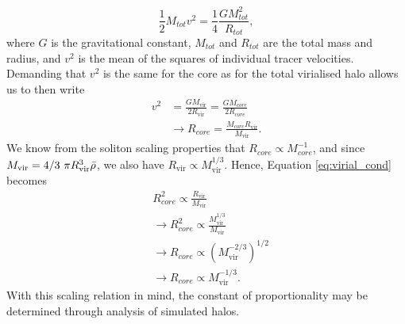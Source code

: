 \documentclass[a4paper,11pt]{article}
\begin{document}
\begin{appendices}
\begin{equation}
    \frac{1}{2}M_{tot}v^2=\frac{1}{4}\frac{GM_{tot}^2}{R_{tot}},
\end{equation}
where $G$ is the gravitational constant, $M_{tot}$ and $R_{tot}$ are the total mass and radius, and $v^2$ is the mean of the squares of individual tracer velocities. Demanding that $v^2$ is the same for the core as for the total virialised halo allows us to then write
\begin{align}\label{eq:virial_cond}
    v^2&=\frac{GM_{\mathrm{vir}}}{2 R_{\mathrm{vir}}}=\frac{G M_{core}}{2 R_{core}}\nonumber\\
    &\rightarrow R_{core}=\frac{M_{core} R_{\mathrm{vir}}}{M_{\mathrm{vir}}}.
\end{align}
We know from the soliton scaling properties that $R_{core}\propto M_{core}^{-1}$, and since $M_{\mathrm{vir}}=4/3 \ \pi R_{\mathrm{vir}}^3 \Bar{\rho}$, we also have $R_{\mathrm{vir}} \propto M_{\mathrm{vir}}^{1/3}$. Hence, Equation \ref{eq:virial_cond} becomes
\begin{align}
    &R_{core}^2\propto \frac{R_{\mathrm{vir}}}{M_{\mathrm{vir}}}\nonumber\\
    &\rightarrow R_{core}^2\propto \frac{M_{\mathrm{vir}}^{1/3}}{M_{\mathrm{vir}}}\nonumber\\
    &\rightarrow R_{core}\propto\left(M_{\mathrm{vir}}^{-2/3}\right)^{1/2}\nonumber\\
    &\rightarrow R_{core}\propto M_{\mathrm{vir}}^{-1/3}.
\end{align}
With this scaling relation in mind, the constant of proportionality may be determined through analysis of simulated halos. 





\end{appendices}
\end{document}
